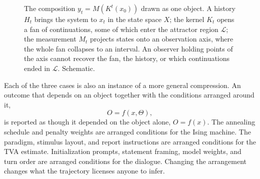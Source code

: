 \documentclass[11pt]{article}
\theoremstyle{definition}
\theoremstyle{remark}
\begin{document}
\begin{figure}[t]
\centering
{}
\caption{The composition $y_t = M(K^t(x_0))$ drawn as one object. A history $H_t$ brings the system to $x_t$ in the state space $X$; the kernel $K_t$ opens a fan of continuations, some of which enter the attractor region $\mathcal{L}$; the measurement $M_t$ projects states onto an observation axis, where the whole fan collapses to an interval. An observer holding points of the axis cannot recover the fan, the history, or which continuations ended in $\mathcal{L}$. Schematic.}
\label{fig:composition}
\end{figure}

Each of the three cases is also an instance of a more general compression. An outcome that depends on an object together with the conditions arranged around it,
\begin{equation}
O = f(x, \Theta),
\end{equation}
is reported as though it depended on the object alone, $O = f(x)$. The annealing schedule and penalty weights are arranged conditions for the Ising machine. The paradigm, stimulus layout, and report instructions are arranged conditions for the TVA estimate. Initialization prompts, statement framing, model weights, and turn order are arranged conditions for the dialogue. Changing the arrangement changes what the trajectory licenses anyone to infer.
\end{document}
